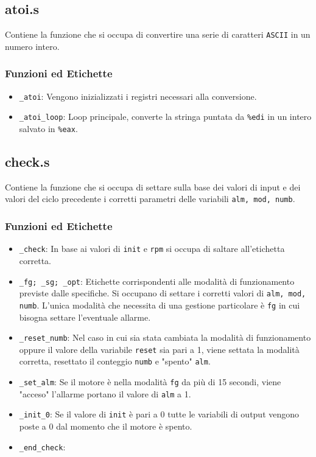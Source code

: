 \documentclass[a4paper,11pt]{article}
\begin{document}
	\subsection{atoi.s}
	Contiene la funzione che si occupa di convertire una serie di caratteri \texttt{ASCII} in un numero intero. 
	\subsubsection{Funzioni ed Etichette}
	\begin{itemize}
		\item \texttt{\_atoi}: Vengono inizializzati i registri necessari alla conversione.
		\item \texttt{\_atoi\_loop}: Loop principale, converte la stringa puntata da \texttt{\%edi} in un intero salvato in \texttt{\%eax}. 
	\end{itemize}
	
	\subsection{check.s}
	Contiene la funzione che si occupa di settare sulla base dei valori di input e dei valori del ciclo precedente i corretti parametri delle variabili \texttt{alm, mod, numb}. 
	\subsubsection{Funzioni ed Etichette}
	\begin{itemize}
		\item \texttt{\_check}: In base ai valori di \texttt{init} e \texttt{rpm} si occupa di saltare all'etichetta corretta. 
		\item \texttt{\_fg; \_sg; \_opt}: Etichette corrispondenti alle modalità di funzionamento previste dalle specifiche. Si occupano di settare i corretti valori di \texttt{alm, mod, numb}. L'unica modalità che necessita di una gestione particolare è \texttt{fg} in cui bisogna settare l'eventuale allarme. 
		\item \texttt{\_reset\_numb}: Nel caso in cui sia stata cambiata la modalità di funzionamento oppure il valore della variabile \texttt{reset} sia pari a 1, viene settata la modalità corretta, resettato il conteggio \texttt{numb} e "spento" \texttt{alm}.
		\item \texttt{\_set\_alm}: Se il motore è nella modalità \texttt{fg} da più di 15 secondi, viene "acceso" l'allarme portano il valore di \texttt{alm} a 1.
		\item \texttt{\_init\_0}: Se il valore di \texttt{init} è pari a 0 tutte le variabili di output vengono poste a 0 dal momento che il motore è spento. 
		\item \texttt{\_end\_check}: 
	\end{itemize}
	
\end{document}
